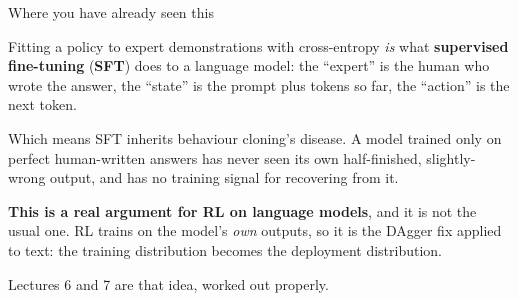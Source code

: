 \documentclass[aspectratio=169]{beamer}
\begin{document}
\begin{frame}{Where you have already seen this}
  \begin{center}
  \begin{tcolorbox}[colback=armblue!8, colframe=armblue, boxrule=0.8pt, arc=2pt, width=0.9\textwidth,
                    title={\textbf{Behaviour cloning is supervised fine-tuning}}]
    \small
    Fitting a policy to expert demonstrations with cross-entropy \emph{is} what
    \textbf{supervised fine-tuning} (\textbf{SFT}) does to a language model: the ``expert'' is
    the human who wrote the answer, the ``state'' is the prompt plus tokens so far, the
    ``action'' is the next token.
  \end{tcolorbox}
  \end{center}

  \vskip 8pt
  \small
  Which means SFT inherits behaviour cloning's disease. A model trained only on perfect
  human-written answers has never seen its own half-finished, slightly-wrong output, and has no
  training signal for recovering from it.

  \vskip 8pt
  \begin{tcolorbox}[colback=paramgreen!8, colframe=paramgreen, boxrule=0.6pt, arc=2pt]
    \small
    \textbf{This is a real argument for RL on language models}, and it is not the usual one. RL
    trains on the model's \emph{own} outputs, so it is the DAgger fix applied to text: the
    training distribution becomes the deployment distribution.

    \vskip 3pt
    Lectures 6 and 7 are that idea, worked out properly.
  \end{tcolorbox}
\end{frame}
\end{document}
